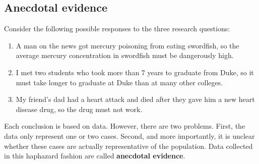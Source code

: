 \documentclass[
  letterpaper,
  DIV=11,
  numbers=noendperiod]{scrreprt}
\providecommand{\tightlist}{%
  \setlength{\itemsep}{0pt}\setlength{\parskip}{0pt}}\usepackage{longtable,booktabs,array}
\begin{document}
\subsection{Anecdotal evidence}\label{anecdotal-evidence}

Consider the following possible responses to the three research
questions:

\begin{enumerate}
\def\labelenumi{\arabic{enumi}.}
\tightlist
\item
  A man on the news got mercury poisoning from eating swordfish, so the
  average mercury concentration in swordfish must be dangerously high.
\item
  I met two students who took more than 7 years to graduate from Duke,
  so it must take longer to graduate at Duke than at many other
  colleges.
\item
  My friend's dad had a heart attack and died after they gave him a new
  heart disease drug, so the drug must not work.
\end{enumerate}

Each conclusion is based on data. However, there are two problems.
First, the data only represent one or two cases. Second, and more
importantly, it is unclear whether these cases are actually
representative of the population. Data collected in this haphazard
fashion are called \textbf{anecdotal evidence}.
\end{document}
